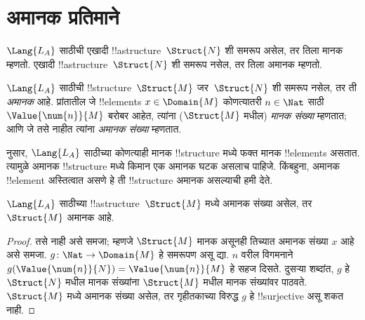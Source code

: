 \documentclass[../../../include/open-logic-section]{subfiles}
\begin{document}
\section{अमानक प्रतिमाने}

\begin{explain}
$\Lang{L_A}$ साठीची एखादी !!a{structure}~$\Struct{N}$ शी समरूप असेल,
तर तिला मानक म्हणतो. एखादी !!a{structure}~$\Struct{N}$ शी समरूप नसेल,
तर तिला अमानक म्हणतो.
\end{explain}

\begin{defn}
$\Lang{L_A}$ साठीची !!{structure}~$\Struct{M}$ जर~$\Struct{N}$ शी समरूप
नसेल, तर ती \emph{अमानक} आहे. प्रांतातील जे !!{element}s
$x \in \Domain{M}$ कोणत्यातरी $n \in \Nat$ साठी
$\Value{\num{n}}{M}$ बरोबर आहेत, त्यांना ($\Struct{M}$ मधील)
\emph{मानक संख्या} म्हणतात; आणि जे तसे नाहीत त्यांना \emph{अमानक संख्या}
म्हणतात.
\end{defn}

\begin{explain}
 नुसार, $\Lang{L_A}$ साठीच्या कोणत्याही
मानक !!{structure} मध्ये फक्त मानक !!{element}s असतात. त्यामुळे अमानक
!!{structure} मध्ये किमान एक अमानक घटक असलाच पाहिजे. किंबहुना, अमानक
!!{element} अस्तित्वात असणे हे ती !!{structure} अमानक असल्याची हमी देते.
\end{explain}

\begin{prop}
$\Lang{L_A}$ साठीच्या !!a{structure}~$\Struct{M}$ मध्ये अमानक संख्या
असेल, तर $\Struct{M}$ अमानक आहे.
\end{prop}

\begin{proof}
तसे नाही असे समजा; म्हणजे $\Struct{M}$ मानक असूनही तिच्यात अमानक संख्या
$x$ आहे असे समजा. $g\colon \Nat \to \Domain{M}$ हे समरूपण असू द्या.
$n$ वरील विगमनाने $g(\Value{\num{n}}{N}) = \Value{\num{n}}{M}$ हे सहज
दिसते. दुसऱ्या शब्दांत, $g$ हे~$\Struct{N}$ मधील मानक संख्यांना
$\Struct{M}$ मधील मानक संख्यांवर पाठवते. $\Struct{M}$ मध्ये अमानक संख्या
असेल, तर गृहीतकाच्या विरुद्ध $g$ हे !!{surjective} असू शकत नाही.
\end{proof}
\end{document}
